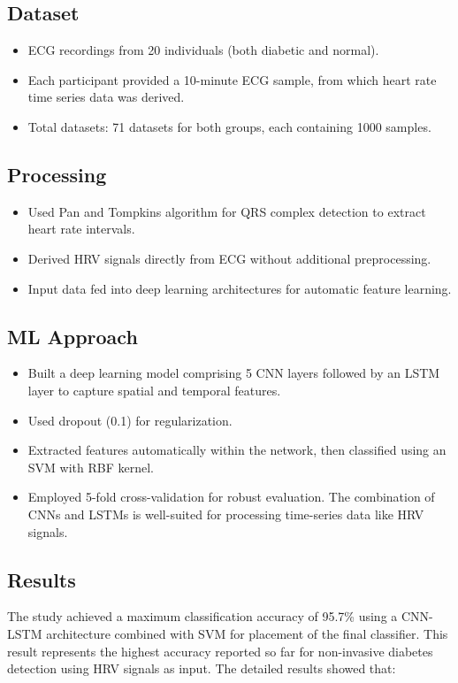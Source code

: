 \subsection*{Dataset}
\begin{itemize}
    \item ECG recordings from 20 individuals (both diabetic and normal).
    \item Each participant provided a 10-minute ECG sample, from which heart rate time series data was derived.
    \item Total datasets: 71 datasets for both groups, each containing 1000 samples.
\end{itemize}

\subsection*{Processing}
\begin{itemize}
    \item Used Pan and Tompkins algorithm for QRS complex detection to extract heart rate intervals.
    \item Derived HRV signals directly from ECG without additional preprocessing.
    \item Input data fed into deep learning architectures for automatic feature learning.
\end{itemize}

\subsection*{ML Approach}
\begin{itemize}
    \item Built a deep learning model comprising 5 CNN layers followed by an LSTM layer to capture spatial and temporal features.
    \item Used dropout (0.1) for regularization.
    \item Extracted features automatically within the network, then classified using an SVM with RBF kernel.
    \item Employed 5-fold cross-validation for robust evaluation. The combination of CNNs and LSTMs is well-suited for processing time-series data like HRV signals.
\end{itemize}
\subsection*{Results}
The study achieved a maximum classification accuracy of 95.7\% using a CNN-LSTM architecture combined with SVM for placement of the final classifier. This result represents the highest accuracy reported so far for non-invasive diabetes detection using HRV signals as input. The detailed results showed that:

